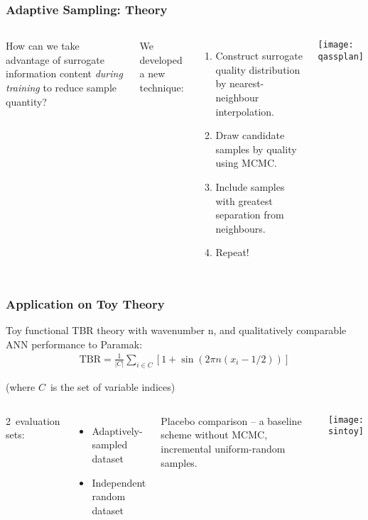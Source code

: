 \begin{frame}
	\frametitle{Adaptive Sampling: Theory}
	 \begin{columns}[onlytextwidth,T]
      \column{\dimexpr\linewidth-6cm-5mm}
        
        How can we take advantage of surrogate information content \textit{during training} to reduce sample quantity? \newline
        
        We developed a new technique:
        \vspace{-5pt}
        \begin{enumerate}
        \item Construct surrogate quality distribution by nearest- neighbour interpolation.
        \item Draw candidate samples by quality using MCMC.
        \item Include samples with greatest separation from neighbours.
        \item Repeat!
        \end{enumerate}
      \column{6cm}
      \texttt{[image: qassplan]}

    \end{columns}
\end{frame}

\begin{frame}
	\frametitle{Application on Toy Theory}
	Toy functional TBR theory with wavenumber n, and qualitatively comparable ANN performance to Paramak:
	\begin{align*}
		\text{TBR} = \frac{1}{|C|}\sum_{i \in C} \left[1 + \sin(2\pi n (x_i - 1/2)) \right]
	\end{align*}

	\vspace{-1em}
	{\footnotesize
		\hfill(where $C$~is the set of variable indices)
	}

	\vspace{1em}

	\begin{columns}[T]
		\column{0.5\paperwidth}
		\vspace{0.5em}
		2~evaluation sets:
		\begin{itemize}
		    \item Adaptively-sampled dataset
		    \item Independent random dataset
		\end{itemize}
		\vspace{15pt}

		Placebo comparison -- a baseline scheme without MCMC, incremental uniform-random samples.


		\column{0.4\paperwidth}
		\hspace{-20pt}\texttt{[image: sintoy]}

	\end{columns}
\end{frame}


